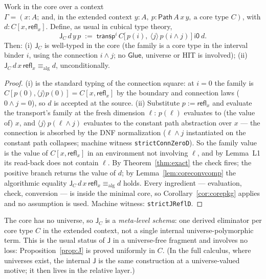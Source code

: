 \documentclass{lmcs}
\newcommand{\transp}{\mathsf{transp}}
\newcommand{\refl}{\mathsf{refl}}
\newcommand{\J}{\mathsf{J}}
\newcommand{\Glue}{\mathsf{Glue}}
\newcommand{\aconv}{\equiv_{\mathrm{alg}}}
\newcommand{\Path}{\mathsf{Path}}
\newcommand{\io}{\mathsf{i0}}
\begin{document}
\begin{prop}[Strict $\J$ in the minimal core; a schema]\label{prop:J}
  Work in the core over a context
  $\Gamma = (x : A;\ \text{and, in the extended context } y : A,\
  p : \Path\,A\,x\,y,\ \text{a core type } C)$, with
  $d : C[x, \refl_x]$.  Define, as usual in cubical type theory,
  \[
    \J_C\,d\,y\,p \;:=\;
    \transp^i\, C\bigl[\,p(i),\ \langle j \rangle\, p(i \wedge j)
    \,\bigr]\ \io\ d .
  \]
  Then: (i) $\J_C$ is well-typed in the core (the family is a core
  type in the interval binder $i$, using the connection
  $i \wedge j$; no $\Glue$, universe or HIT is involved);
  (ii) $\J_C\,d\,x\,\refl_x \aconv d$, unconditionally.
\end{prop}
\begin{proof}
  (i) is the standard typing of the connection square: at $i=0$
  the family is $C[p(0), \langle j \rangle p(0)] =
  C[x, \refl_x]$ by the boundary and connection laws ($0 \wedge j
  = 0$), so $d$ is accepted at the source.
  (ii) Substitute $p := \refl_x$ and evaluate the transport's
  family at the fresh dimension $\ell$:
  $p(\ell)$ evaluates to (the value of) $x$, and
  $\langle j \rangle\, p(\ell \wedge j)$ evaluates to the constant
  path abstraction over $x$ --- the connection is absorbed by the
  DNF normalization ($\ell \wedge j$ instantiated on the constant
  path collapses; machine witness \texttt{strictConnZeroD}).  So
  the family value is the value of $C[x, \refl_x]$ in an
  environment not involving $\ell$, and by Lemma~L1 its read-back
  does not contain $\ell$.  By Theorem~\ref{thm:exact} the check
  fires; the positive branch returns the value of $d$; by
  Lemma~\ref{lem:coreconvcomp} the algorithmic equality
  $\J_C\,d\,x\,\refl_x \aconv d$ holds.  Every ingredient ---
  evaluation, check, conversion --- is inside the minimal core, so
  Corollary~\ref{cor:corepkg} applies and no assumption is used.
  Machine witness: \texttt{strictJReflD}.
\end{proof}

\begin{rem}
  The core has no universe, so $\J_C$ is a \emph{meta-level schema}:
  one derived eliminator per core type $C$ in the extended context,
  not a single internal universe-polymorphic term.  This is the
  usual status of $\J$ in a universe-free fragment and involves no
  loss: Proposition~\ref{prop:J} is proved uniformly in $C$.  (In
  the full calculus, where universes exist, the internal $\J$ is the
  same construction at a universe-valued motive; it then lives in
  the relative layer.)
\end{rem}
\end{document}

